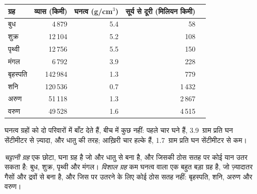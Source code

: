 \begin{center}
\small
\begin{tabular}{lrrrr}
\hline
ग्रह & व्यास (किमी) & घनत्व (g/cm$^3$) & सूर्य से दूरी (मिलियन किमी)\\
\hline
बुध & 4\,879 & 5.4 & 58\\
शुक्र & 12\,104 & 5.2 & 108\\
पृथ्वी & 12\,756 & 5.5 & 150\\
मंगल & 6\,792 & 3.9 & 228\\
\hline
बृहस्पति & 142\,984 & 1.3 & 779\\
शनि & 120\,536 & 0.7 & 1\,432\\
अरुण & 51\,118 & 1.3 & 2\,867\\
वरुण & 49\,528 & 1.6 & 4\,515\\
\hline
\end{tabular}
\end{center}

घनत्व ग्रहों को दो परिवारों में बाँट देते हैं, बीच में कुछ नहीं: पहले चार घने हैं,
3.9~ग्राम प्रति घन सेंटीमीटर से ज़्यादा,  और धातु की तरह; आख़िरी चार हल्के हैं,
1.7~ग्राम प्रति घन
सेंटीमीटर से कम।

\begin{definition}[चट्टानी ग्रह और विशाल ग्रह]\label{def:g6:earth-a-planet:planet-types}
\emph{चट्टानी ग्रह} एक छोटा, घना ग्रह है जो  और धातु से
बना है, और जिसकी ठोस सतह पर कोई यान उतर सकता है: बुध, शुक्र, पृथ्वी और मंगल।
\emph{विशाल ग्रह} कम घनत्व वाला एक बहुत बड़ा ग्रह है, जो ज़्यादातर
गैसों और द्रवों से बना है, और जिस पर उतरने के लिए कोई ठोस सतह नहीं: बृहस्पति, शनि,
अरुण और वरुण।
\end{definition}


